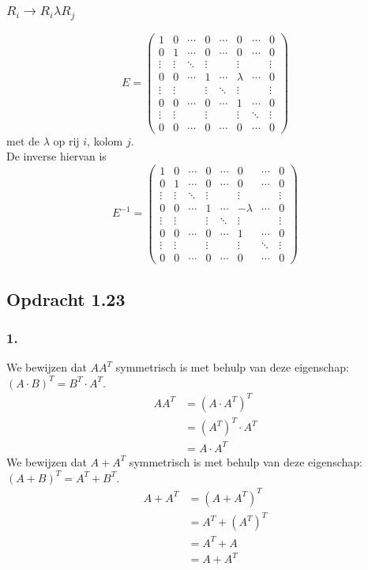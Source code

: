 \documentclass[lineaire_algebra_oplossingen.tex]{subfiles}
\begin{document}
\subsubsection*{$R_i \rightarrow R_i \lambda R_j$}
\[
E=
\begin{pmatrix}
1 & 0 & \cdots & 0 & \cdots & 0 & \cdots & 0\\
0 & 1 & \cdots & 0 & \cdots & 0 & \cdots & 0\\
\vdots & \vdots & \ddots & \vdots& & \vdots & &\vdots\\
0 & 0 & \cdots & 1 & \cdots & \lambda & \cdots & 0\\
\vdots & \vdots & & \vdots& \ddots & \vdots & &\vdots\\
0 & 0 & \cdots & 0 & \cdots & 1 & \cdots & 0\\
\vdots & \vdots & & \vdots & & \vdots & \ddots & \vdots\\
0 & 0 & \cdots & 0 & \cdots & 0 & \cdots & 0
\end{pmatrix}
\]
met de $\lambda$ op rij $i$, kolom $j$.\\
De inverse hiervan is 
\[
E^{-1}=
\begin{pmatrix}
1 & 0 & \cdots & 0 & \cdots & 0 & \cdots & 0\\
0 & 1 & \cdots & 0 & \cdots & 0 & \cdots & 0\\
\vdots & \vdots & \ddots & \vdots& & \vdots & &\vdots\\
0 & 0 & \cdots & 1 & \cdots & -\lambda & \cdots & 0\\
\vdots & \vdots & & \vdots& \ddots & \vdots & &\vdots\\
0 & 0 & \cdots & 0 & \cdots & 1 & \cdots & 0\\
\vdots & \vdots & & \vdots & & \vdots & \ddots & \vdots\\
0 & 0 & \cdots & 0 & \cdots & 0 & \cdots & 0
\end{pmatrix}
\]

\subsection{Opdracht 1.23}
\label{1.23}
\subsubsection*{1.}
We bewijzen dat $AA^T$ symmetrisch is met behulp van deze eigenschap: $(A\cdot B)^T = B^T \cdot A^T$.
\begin{align*}
AA^T
&= (A\cdot A^T)^T\\
&= (A^T)^T \cdot A^T \\
&= A \cdot A^T
\end{align*}
We bewijzen dat $A+A^T$ symmetrisch is met behulp van deze eigenschap: $(A+B)^T = A^T + B^T$.
\begin{align*}
A +A^T
&= (A +A^T)^T \\
&= A^T + (A^T)^T \\
&= A^T + A \\
&= A + A^T
\end{align*}
\end{document}
